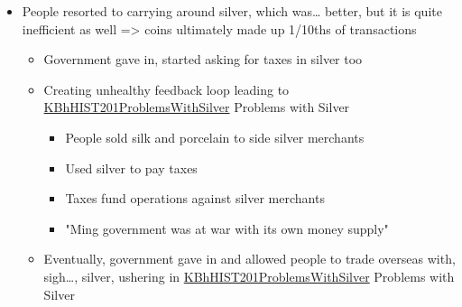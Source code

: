 \documentclass[letterpaper]{article}
\begin{document}
\begin{itemize}
\item People resorted to carrying around silver, which was\ldots{} better, but it
is quite inefficient as well => coins ultimately made up 1/10ths of
transactions

\begin{itemize}
\item Government gave in, started asking for taxes in silver too
\item Creating unhealthy feedback loop leading to
\href{KBhHIST201ProblemsWithSilver.org}{KBhHIST201ProblemsWithSilver}
Problems with Silver

\begin{itemize}
\item People sold silk and porcelain to side silver merchants
\item Used silver to pay taxes
\item Taxes fund operations against silver merchants
\item "Ming government was at war with its own money supply"
\end{itemize}

\item Eventually, government gave in and allowed people to trade overseas
with, sigh\ldots{}, silver, ushering in
\href{KBhHIST201ProblemsWithSilver.org}{KBhHIST201ProblemsWithSilver}
Problems with Silver
\end{itemize}
\end{itemize}
\end{document}
